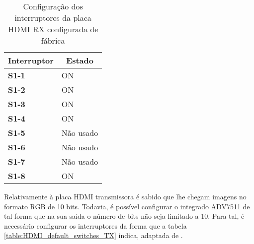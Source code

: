 \begin{table}[h!]
	\centering
		\caption{Configuração dos interruptores da placa HDMI RX configurada de fábrica}
	\label{table:HDMI_default_switches_RX}
		\begin{tabular}{@{}l|l@{}}
			\toprule
			\multicolumn{1}{c}{\textbf{Interruptor}} & \multicolumn{1}{c}{\textbf{Estado}} \\ \midrule
			\textbf{S1-1}                            & ON                                  \\
			\textbf{S1-2}                            & ON                                  \\
			\textbf{S1-3}                            & ON                                  \\
			\textbf{S1-4}                            & ON                                  \\
			\textbf{S1-5}                            & Não usado                           \\
			\textbf{S1-6}                            & Não usado                           \\
			\textbf{S1-7}                            & Não usado                           \\
			\textbf{S1-8}                            & ON                                  \\ \bottomrule
		\end{tabular}%
\end{table}

Relativamente à placa HDMI transmissora é sabido que lhe chegam imagens no formato RGB de 10 bits. Todavia, é possível configurar o integrado ADV7511 de tal forma que na sua saída o número de bits não seja limitado a 10. Para tal, é necessário configurar os interruptores da forma que a tabela \ref{table:HDMI_default_switches_TX} indica, adaptada de \cite{R009}.

